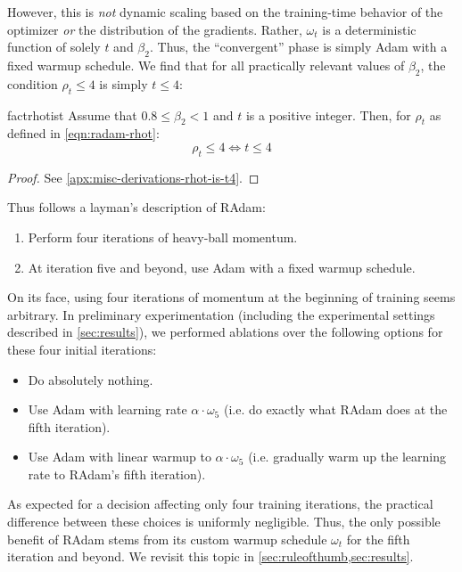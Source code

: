 {However, this is \emph{not} dynamic scaling based on the training-time behavior of the optimizer \emph{or} the distribution of the gradients. Rather, $\omega_t$ is a deterministic function of solely $t$ and $\beta_2$. Thus, the ``convergent'' phase is simply Adam with a fixed warmup schedule. We find that for all practically relevant values of $\beta_2$, the condition $\rho_t \leq 4$ is simply $t \leq 4$:

\begin{restatable}[]{fact}{rhotist} \label{fact:rhot4-is-t4}
  Assume that $0.8 \leq \beta_2 < 1$ and $t$ is a positive integer. Then, for $\rho_t$ as defined in \cref*{eqn:radam-rhot}:
  \begin{equation*}
    \rho_t \leq 4 \iff t \leq 4
  \end{equation*}
\end{restatable}
\begin{proof}
See \cref*{apx:misc-derivations-rhot-is-t4}.
\end{proof}

Thus follows a layman's description of RAdam:
\begin{enumerate}
    \item Perform four iterations of heavy-ball momentum.
    \item At iteration five and beyond, use Adam with a fixed warmup schedule.
\end{enumerate}

On its face, using four iterations of momentum at the beginning of training seems arbitrary. In preliminary experimentation (including the experimental settings described in \cref*{sec:results}), we performed ablations over the following options for these four initial iterations:
\begin{itemize}
  \item Do absolutely nothing.
  \item Use Adam with learning rate $\alpha \cdot \omega_5$ (i.e. do exactly what RAdam does at the fifth iteration).
  \item Use Adam with linear warmup to $\alpha \cdot \omega_5$ (i.e. gradually warm up the learning rate to RAdam's fifth iteration).
\end{itemize}
As expected for a decision affecting only four training iterations, the practical difference between these choices is uniformly negligible. Thus, the only possible benefit of RAdam stems from its custom warmup schedule $\omega_t$ for the fifth iteration and beyond. We revisit this topic in \cref*{sec:ruleofthumb,sec:results}.

}
